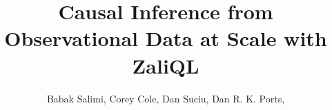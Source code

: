 
\title{Causal Inference from Observational Data at Scale with ZaliQL}


\author{
    Babak Salimi,
    Corey Cole,
    Dan Suciu,
    Dan R. K. Ports,
}

